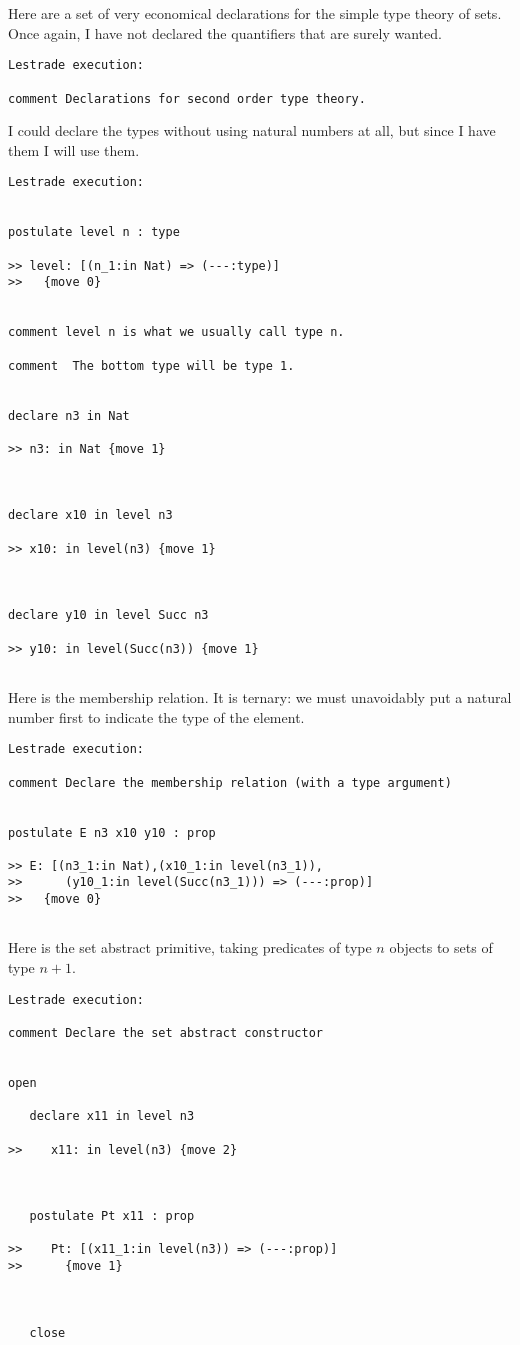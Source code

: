 \documentclass[12pt]{article}
\begin{document}
Here are a set of very economical declarations for the simple type theory of sets.  Once again, I have not declared the quantifiers that are surely wanted.

\begin{verbatim}Lestrade execution:

comment Declarations for second order type theory.

\end{verbatim}

I could declare the types without using natural numbers at all, but since I have them I will use them.

\begin{verbatim}Lestrade execution:


postulate level n : type

>> level: [(n_1:in Nat) => (---:type)]
>>   {move 0}


comment level n is what we usually call type n.  

comment  The bottom type will be type 1.


declare n3 in Nat

>> n3: in Nat {move 1}



declare x10 in level n3

>> x10: in level(n3) {move 1}



declare y10 in level Succ n3

>> y10: in level(Succ(n3)) {move 1}


\end{verbatim}

Here is the membership relation.  It is ternary:  we must unavoidably put a natural number first to indicate the type of the element.

\begin{verbatim}Lestrade execution:

comment Declare the membership relation (with a type argument)


postulate E n3 x10 y10 : prop

>> E: [(n3_1:in Nat),(x10_1:in level(n3_1)),
>>      (y10_1:in level(Succ(n3_1))) => (---:prop)]
>>   {move 0}


\end{verbatim}

Here is the set abstract primitive, taking predicates of type $n$ objects to sets of type $n+1$.

\begin{verbatim}Lestrade execution:

comment Declare the set abstract constructor


open

   declare x11 in level n3

>>    x11: in level(n3) {move 2}



   postulate Pt x11 : prop

>>    Pt: [(x11_1:in level(n3)) => (---:prop)]
>>      {move 1}



   close
\end{verbatim}
\end{document}
